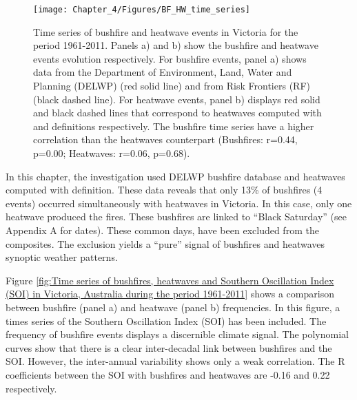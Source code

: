\begin{figure}[h]
\noindent \begin{centering}
\texttt{[image: Chapter\_4/Figures/BF\_HW\_time\_series]}
\par\end{centering}

\caption[Time series of bushfire and heatwave events in Victoria for the period
1961-2011]{Time series of bushfire and heatwave events in Victoria for the period
1961-2011. Panels a) and b) show the bushfire and heatwave events
evolution respectively. For bushfire events, panel a) shows data from
the Department of Environment, Land, Water and Planning (DELWP) (red
solid line) and from Risk Frontiers (RF) (black dashed line). For
heatwave events, panel b) displays red solid and black dashed lines
that correspond to heatwaves computed with \citet{Nairn2009} and
\citet{Pezza2012} definitions respectively. The bushfire time series
have a higher correlation than the heatwaves counterpart (Bushfires:
r=0.44, p=0.00; Heatwaves: r=0.06, p=0.68). \label{fig:Time series of bushfire and heatwave events in Victoria for the period 1961-2011}}
\end{figure}


In this chapter, the investigation used DELWP bushfire database and
heatwaves computed with \citet{Nairn2009} definition. These data
reveals that only 13\% of bushfires (4 events) occurred simultaneously
with heatwaves in Victoria. In this case, only one heatwave produced
the fires. These bushfires are linked to ``Black Saturday'' (see
Appendix A for dates). These common days, have been excluded from
the composites. The exclusion yields a ``pure'' signal of bushfires
and heatwaves synoptic weather patterns. 

Figure \ref{fig:Time series of bushfires, heatwaves and Southern Oscillation Index (SOI) in Victoria, Australia during the period 1961-2011}
shows a comparison between bushfire (panel a) and heatwave (panel
b) frequencies. In this figure, a times series of the Southern Oscillation
Index (SOI) has been included. The frequency of bushfire events displays
a discernible climate signal. The polynomial curves show that there
is a clear inter-decadal link between bushfires and the SOI. However,
the inter-annual variability shows only a weak correlation. The R
coefficients between the SOI with bushfires and heatwaves are -0.16
and 0.22 respectively. 

